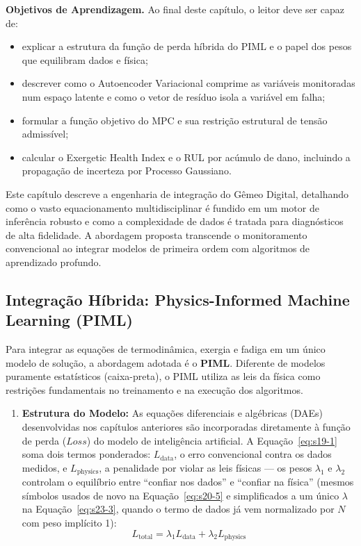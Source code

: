 \documentclass[12pt,a4paper]{article}
\numberwithin{equation}{section}
\numberwithin{table}{section}
\numberwithin{figure}{section}
\begin{document}
{\textbf{Objetivos de Aprendizagem.} Ao final deste capítulo, o leitor deve ser
capaz de:
\begin{itemize}
	\item explicar a estrutura da função de perda híbrida do PIML e o papel
	dos pesos que equilibram dados e física;
	\item descrever como o Autoencoder Variacional comprime as variáveis
	monitoradas num espaço latente e como o vetor de resíduo isola a
	variável em falha;
	\item formular a função objetivo do MPC e sua restrição estrutural de
	tensão admissível;
	\item calcular o Exergetic Health Index e o RUL por acúmulo de dano,
	incluindo a propagação de incerteza por Processo Gaussiano.
\end{itemize}

Este capítulo descreve a engenharia de integração do Gêmeo Digital, detalhando como o vasto equacionamento multidisciplinar é fundido em um motor de inferência robusto e como a complexidade de dados é tratada para diagnósticos de alta fidelidade. A abordagem proposta transcende o monitoramento convencional ao integrar modelos de primeira ordem com algoritmos de aprendizado profundo.

\subsection{Integração Híbrida: Physics-Informed Machine Learning (PIML)}

Para integrar as equações de termodinâmica, exergia e fadiga em um único modelo de solução, a abordagem adotada é o \textbf{PIML}. Diferente de modelos puramente estatísticos (caixa-preta), o PIML utiliza as leis da física como restrições fundamentais no treinamento e na execução dos algoritmos.

\begin{enumerate}
	\item \textbf{Estrutura do Modelo:}
	As equações diferenciais e algébricas (DAEs) desenvolvidas nos capítulos anteriores são incorporadas diretamente à função de perda ($Loss$) do modelo de inteligência artificial. A Equação~\eqref{eq:s19-1} soma dois termos ponderados: $L_{\text{data}}$, o erro convencional contra os dados medidos, e $L_{\text{physics}}$, a penalidade por violar as leis físicas — os pesos $\lambda_1$ e $\lambda_2$ controlam o equilíbrio entre ``confiar nos dados'' e ``confiar na física'' (mesmos símbolos usados de novo na Equação~\eqref{eq:s20-5} e simplificados a um único $\lambda$ na Equação~\eqref{eq:s23-3}, quando o termo de dados já vem normalizado por $N$ com peso implícito 1):
	\begin{equation}\label{eq:s19-1}
 L_{\text{total}} = \lambda_1 L_{\text{data}} + \lambda_2 L_{\text{physics}}
\end{equation}


\end{enumerate}}
\end{document}
